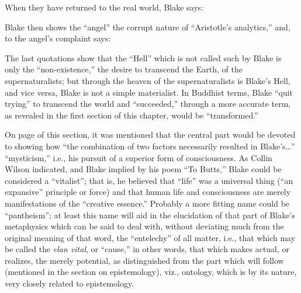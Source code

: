 
\noindent When they have returned to the real world, Blake says:


Blake then shows the \enquote{angel} the corrupt nature of \enquote{Aristotle's analytics,} and, to the angel's complaint says:


The last quotations show that the \enquote{Hell} which is not called such by Blake is only the
\enquote{non-existence,} the desire to transcend the Earth, of the supernaturalists; but through the
heaven of the supernaturalists is Blake's Hell, and vice versa, Blake is not a simple materialist. In Buddhist terms,
Blake \enquote{quit trying} to transcend the world and \enquote{succeeded,} through a more accurate term,
as revealed in the first section of this chapter, would be \enquote{transformed.}

On page \pageref{self:24} of this section, it was mentioned that the central part would be devoted
to showing how \enquote{the combination of two factors necessarily resulted in Blake's\dots} \enquote{mysticism,} i.e., his
pursuit of a superior form of consciousness. As Collin Wilson indicated, and Blake implied by
his poem \enquote{To Butts,} Blake could be considered a \enquote{vitalist}; that is, he believed that \enquote{life} was a universal
thing (\enquote{an expansive} principle or force) and that human life and consciousness are merely
manifestations of the \enquote{creative essence.} Probably a more fitting name could be \enquote{pantheism}; at least
this name will aid in the elucidation of that part of Blake's metaphysics which can be said to deal with,
without deviating much from the original meaning of that word, the \enquote{entelechy} of all matter, i.e., that
which may be called the \emph{elan vital}, or \enquote{cause,} in other words, that which makes actual,
or realizes, the merely potential, as distinguished from the part which will follow (mentioned in the section on
epistemology), viz., ontology, which is by its nature, very closely related to epistemology.

